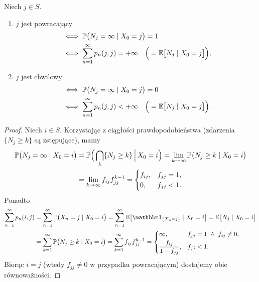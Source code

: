 \documentclass[dvipsnames]{book}
\begin{document}
\begin{twierdzenie}
Niech $j \in S$.
\begin{enumerate}
  \item $j$ jest powracający
  \begin{align*}
    &\iff \P\big(N_j = \infty \mid X_0 = j\big) = 1 \\
    &\iff \sum_{n=1}^{\infty} p_n(j,j) = +\infty
      \quad \Big(= \E\big[N_j \mid X_0 = j\big]\Big),
  \end{align*}
  \item $j$ jest chwilowy
  \begin{align*}
    &\iff \P\big(N_j = \infty \mid X_0 = j\big) = 0 \\
    &\iff \sum_{n=1}^{\infty} p_n(j,j) < +\infty
      \quad \Big(= \E\big[N_j \mid X_0 = j\big]\Big).
  \end{align*}
\end{enumerate}
\end{twierdzenie}

\begin{proof}
Niech $i \in S$. Korzystając z ciągłości prawdopodobieństwa (zdarzenia
$\{N_j \geq k\}$ są zstępujące), mamy
\begin{align*}
  \P\big(N_j = \infty \mid X_0 = i\big)
  &= \P\Big(\bigcap_{k} \{N_j \geq k\} \,\Big|\, X_0 = i\Big)
   = \lim_{k \to \infty} \P\big(N_j \geq k \mid X_0 = i\big) \\
  &= \lim_{k \to \infty} f_{ij} f_{jj}^{k-1}
   = \begin{cases}
       f_{ij}, & f_{jj} = 1, \\
       0, & f_{jj} < 1.
     \end{cases}
\end{align*}
Ponadto
\begin{align*}
  \sum_{n=1}^{\infty} p_n(i,j)
  &= \sum_{n=1}^{\infty} \P\big(X_n = j \mid X_0 = i\big)
   = \sum_{n=1}^{\infty} \E\big[\ind_{\{X_n = j\}} \mid X_0 = i\big]
   = \E\big[N_j \mid X_0 = i\big] \\
  &= \sum_{k=1}^{\infty} \P\big(N_j \geq k \mid X_0 = i\big)
   = \sum_{k=1}^{\infty} f_{ij} f_{jj}^{k-1}
   = \begin{cases}
       \infty, & f_{jj} = 1 \ \wedge\ f_{ij} \neq 0, \\[2pt]
       \dfrac{f_{ij}}{1 - f_{jj}}, & f_{jj} < 1.
     \end{cases}
\end{align*}
Biorąc $i = j$ (wtedy $f_{jj} \neq 0$ w przypadku powracającym) dostajemy
obie równoważności.
\end{proof}
\end{document}
